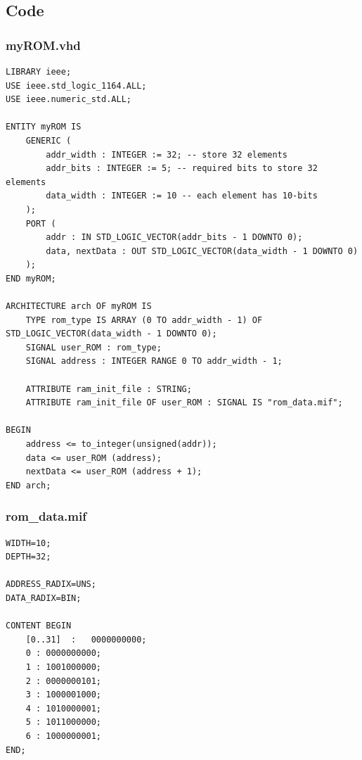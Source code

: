 \documentclass[13pt,a4paper]{report}
\begin{document}
\subsection{Code}

\subsubsection{myROM.vhd}
\begin{verbatim}
LIBRARY ieee;
USE ieee.std_logic_1164.ALL;
USE ieee.numeric_std.ALL;

ENTITY myROM IS
	GENERIC (
		addr_width : INTEGER := 32; -- store 32 elements
		addr_bits : INTEGER := 5; -- required bits to store 32 elements
		data_width : INTEGER := 10 -- each element has 10-bits
	);
	PORT (
		addr : IN STD_LOGIC_VECTOR(addr_bits - 1 DOWNTO 0);
		data, nextData : OUT STD_LOGIC_VECTOR(data_width - 1 DOWNTO 0)
	);
END myROM;

ARCHITECTURE arch OF myROM IS
	TYPE rom_type IS ARRAY (0 TO addr_width - 1) OF STD_LOGIC_VECTOR(data_width - 1 DOWNTO 0);
	SIGNAL user_ROM : rom_type;
	SIGNAL address : INTEGER RANGE 0 TO addr_width - 1;

	ATTRIBUTE ram_init_file : STRING;
	ATTRIBUTE ram_init_file OF user_ROM : SIGNAL IS "rom_data.mif";

BEGIN
	address <= to_integer(unsigned(addr));
	data <= user_ROM (address);
	nextData <= user_ROM (address + 1);
END arch;
\end{verbatim}

\subsubsection{rom\_data.mif}
\begin{verbatim}
WIDTH=10;
DEPTH=32;

ADDRESS_RADIX=UNS;
DATA_RADIX=BIN;

CONTENT BEGIN
	[0..31]  :   0000000000;
	0 : 0000000000;
	1 : 1001000000;
	2 : 0000000101;
	3 : 1000001000;
	4 : 1010000001;
	5 : 1011000000;
	6 : 1000000001;
END;
\end{verbatim}
\end{document}
